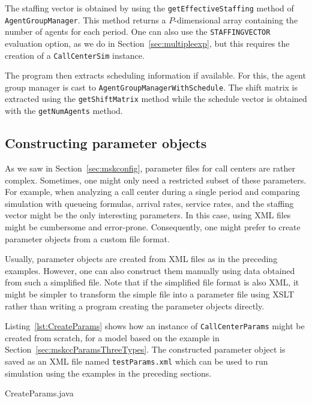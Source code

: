 The staffing vector is obtained by using the \texttt{get\-Effective\-Staffing}
method of \texttt{Agent\-Group\-Manager}.
This method returns a $P$-dimensional array containing the number of
agents for each period.
One can also use the \texttt{STAFFINGVECTOR} evaluation option, as we
do in Section~\ref{sec:multipleexp}, but this requires the creation of a
\texttt{Call\-Center\-Sim} instance.

The program then extracts scheduling information if available. For
this, the agent group manager is cast to
\texttt{Agent\-Group\-Manager\-With\-Schedule}.
The shift matrix is extracted using the \texttt{get\-Shift\-Matrix}
method while the schedule vector is obtained with
the \texttt{get\-Num\-Agents} method.

\subsection{Constructing parameter objects}
\label{sec:makeparams}

As we saw in Section~\ref{sec:mskconfig}, parameter files for call
centers are rather complex.
Sometimes, one might only need a restricted subset of these
parameters.  For example, when analyzing a call center during a single
period and comparing simulation with queueing formulas, arrival rates,
service rates, and the staffing vector might be the only interesting
parameters.
In this case, using XML files might be cumbersome and error-prone.
Consequently, one might prefer to create
parameter objects from a custom file format.

Usually, parameter objects are created from XML files as in the
preceding examples.  However, one can also construct them manually
using data obtained from such a simplified file.
Note that if the simplified file format is also XML, it might be
simpler to transform the simple file into a parameter file using
XSLT rather than writing a program creating the parameter objects directly.

Listing~\ref{lst:CreateParams} shows how an instance of
\texttt{Call\-Center\-Params} might be created from scratch,
for a model based on the example in
Section~\ref{sec:mskccParamsThreeTypes}.
The constructed parameter object is saved as an XML file named
\texttt{testParams.xml} which can be used to run simulation using the
examples in the preceding sections.


{CreateParams.java}

